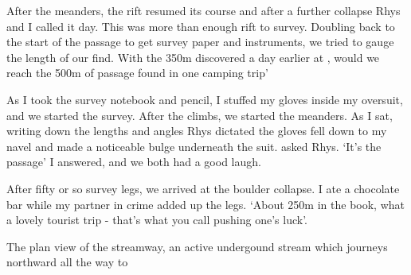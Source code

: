 After the meanders, the rift resumed its course and after a further collapse Rhys and I called it day. This was more than enough rift to survey. Doubling back to the start of the passage to get survey paper and instruments, we tried to gauge the length of our find. With the 350m discovered a day earlier at , would we reach the 500m of passage found in one camping trip'


As I took the survey notebook and pencil, I stuffed my gloves inside my oversuit, and we started the survey. After the climbs, we started the meanders. As I sat, writing down the lengths and angles Rhys dictated the gloves fell down to my navel and made a noticeable bulge underneath the suit.
 asked Rhys.
`It's the passage' I answered, and we both had a good laugh.

After fifty or so survey legs, we arrived at the boulder collapse. I ate a chocolate bar while my partner in crime added up the legs. `About 250m in the book, what a lovely tourist trip - that's what you call pushing one's luck'.


\begin{survey}[b!]
\checkoddpage \ifoddpage \forcerectofloat \else \forceversofloat \fi
\centering
{}
\caption{The plan view of the \protect{} streamway, an active undergound stream which journeys northward all the way to \protect{} }
\label{map:pushyourluck}
\end{survey}
